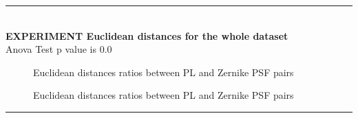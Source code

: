 \rule{0.5\textwidth}{0.5pt}\\

	{\large \textbf{EXPERIMENT Euclidean distances for the whole dataset}}\\
	Anova Test p value is 0.0
	\begin{figure*}[ht!]
		\centering
		\caption{Euclidean distances ratios between PL and Zernike PSF pairs}\hspace{\fill}
	\end{figure*}
	
	\begin{figure*}[ht!]
		\centering
		\caption{Euclidean distances ratios between PL and Zernike PSF pairs}\hspace{\fill}
	\end{figure*}
	
\FloatBarrier	
\rule{0.5\textwidth}{0.5pt}\\